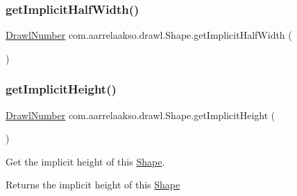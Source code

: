 \subsubsection{\texorpdfstring{get\+Implicit\+Half\+Width()}{getImplicitHalfWidth()}}
{\footnotesize\ttfamily \hyperlink{classcom_1_1aarrelaakso_1_1drawl_1_1_drawl_number}{Drawl\+Number} com.\+aarrelaakso.\+drawl.\+Shape.\+get\+Implicit\+Half\+Width (\begin{DoxyParamCaption}{ }\end{DoxyParamCaption})\hspace{0.3cm}{\ttfamily [protected]}}

\mbox{\label{classcom_1_1aarrelaakso_1_1drawl_1_1_shape_a41cc097acddea53404b62a812ef37276}} 
\subsubsection{\texorpdfstring{get\+Implicit\+Height()}{getImplicitHeight()}}
{\footnotesize\ttfamily \hyperlink{classcom_1_1aarrelaakso_1_1drawl_1_1_drawl_number}{Drawl\+Number} com.\+aarrelaakso.\+drawl.\+Shape.\+get\+Implicit\+Height (\begin{DoxyParamCaption}{ }\end{DoxyParamCaption})\hspace{0.3cm}{\ttfamily [protected]}}



Get the implicit height of this \hyperlink{classcom_1_1aarrelaakso_1_1drawl_1_1_shape}{Shape}. 

\begin{DoxyReturn}{Returns}
the implicit height of this \hyperlink{classcom_1_1aarrelaakso_1_1drawl_1_1_shape}{Shape} 
\end{DoxyReturn}
\mbox{\label{classcom_1_1aarrelaakso_1_1drawl_1_1_shape_af7ebce58a8dbba0cbe372040b74d7fca}} 
